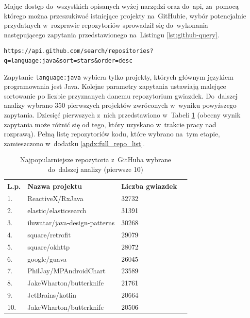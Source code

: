 \documentclass[twoside]{praca}
\begin{document}
Mając dostęp do~wszystkich opisanych wyżej narzędzi oraz do~\gls{api}, za~pomocą którego można przeszukiwać istniejące projekty na~GitHubie, wybór potencjalnie przydatnych w~rozprawie repozytoriów sprowadził się do~wykonania następującego zapytania przedstawionego na~Listingu \ref{lst:github-query}.

\begin{lstlisting}[frame=single,caption={Zapytanie do~GitHub Search \gls{api} wybierające repozytoria kodu źródłowego do~dalszej analizy},captionpos=b,label={lst:github-query}]
https://api.github.com/search/repositories?q=language:java&sort=stars&order=desc
\end{lstlisting}

Zapytanie \texttt{language:java} wybiera tylko projekty, których głównym językiem programowania jest Java. Kolejne parametry zapytania ustawiają malejące sortowanie po liczbie przyznanych danemu repozytorium gwiazdek. Do~dalszej analizy wybrano 350 pierwszych projektów zwróconych w~wyniku powyższego zapytania. Dziesięć pierwszych z~nich przedstawiono w~Tabeli \ref{tbl:github-top-10} (obecny wynik zapytania może różnić się od tego, który uzyskano w~trakcie pracy nad rozprawą). Pełną listę repozytoriów kodu, które wybrano na~tym etapie, zamieszczono w~dodatku \ref{apdx:full_repo_list}.

\begin{table}[h]
\centering
\caption{Najpopularniejsze repozytoria z~GitHuba wybrane do~dalszej analizy (pierwsze 10)}
\label{tbl:github-top-10}
\begin{tabular}{|l|l|l|l|}
  \hline 
  \textbf{L.p.} & \textbf{Nazwa projektu} & \textbf{Liczba gwiazdek} \\ \hline
  1. & ReactiveX/RxJava & 32732 \\ \hline
  2. & elastic/elasticsearch & 31391 \\ \hline
  3. & iluwatar/java-design-patterns & 30268 \\ \hline
  4. & square/retrofit & 29079 \\ \hline
  5. & square/okhttp & 28072 \\ \hline
  6. & google/guava & 26045 \\ \hline
  7. & PhilJay/MPAndroidChart & 23589 \\ \hline
  8. & JakeWharton/butterknife & 21761 \\ \hline
  9. & JetBrains/kotlin & 20664 \\ \hline
  10. & JakeWharton/butterknife & 20506 \\ \hline
\end{tabular} 
\end{table}
\end{document}
